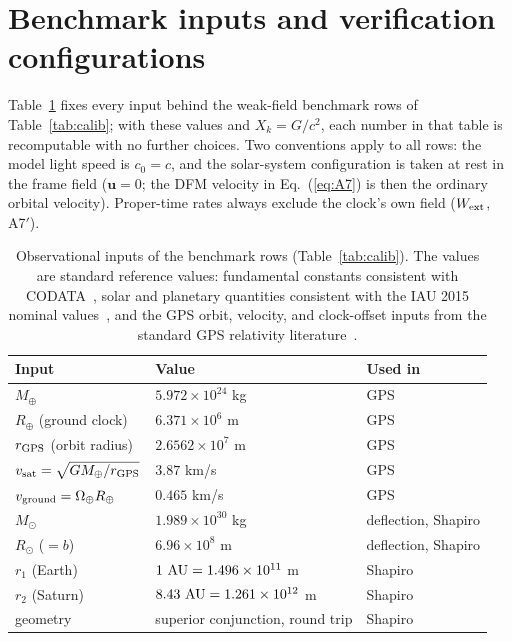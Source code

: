\documentclass[aps,reprint,amsmath,amssymb,nofootinbib,superscriptaddress,floatfix]{revtex4-2}
\newcommand{\vect}[1]{\bm{#1}}
\newcommand{\Kt}{X_k}
\begin{document}
\section{Benchmark inputs and verification configurations}
\label{app:inputs}

Table~\ref{tab:inputs} fixes every input behind the weak-field
benchmark rows of Table~\ref{tab:calib}; with these values and
$\Kt = G/c^2$, each number in that table is recomputable with no
further choices.
Two conventions apply to all rows: the model light speed is
$c_0 = c$, and the solar-system configuration is taken at rest in the
frame field ($\vect{u} = 0$; the DFM velocity in Eq.~(\ref{eq:A7}) is
then the ordinary orbital velocity).
Proper-time rates always exclude the clock's own field
($W_{\rm ext}$, A7$'$).

\begin{table}[h]
\caption{\label{tab:inputs}%
Observational inputs of the benchmark rows (Table~\ref{tab:calib}).
The values are standard reference values: fundamental constants
consistent with CODATA~\cite{CODATA2022}, solar and planetary
quantities consistent with the IAU 2015 nominal
values~\cite{Prsa2016}, and the GPS orbit, velocity, and clock-offset
inputs from the standard GPS relativity literature~\cite{Ashby2003}.}
\begin{ruledtabular}
\begin{tabular}{p{}p{}p{}}
Input & Value & Used in \\
\hline
$M_\oplus$ & $5.972\times10^{24}$ kg & GPS \\
$R_\oplus$ (ground clock) & $6.371\times10^{6}$ m & GPS \\
$r_{\rm GPS}$ (orbit radius) & $2.6562\times10^{7}$ m & GPS \\
$v_{\rm sat} = \sqrt{GM_\oplus/r_{\rm GPS}}$ & $3.87$ km/s & GPS \\
$v_{\rm ground} = \Omega_\oplus R_\oplus$ & $0.465$ km/s & GPS \\
$M_\odot$ & $1.989\times10^{30}$ kg & deflection, Shapiro \\
$R_\odot$ ($=b$) & $6.96\times10^{8}$ m & deflection, Shapiro \\
$r_1$ (Earth) & $1\ {\rm AU} = 1.496\times10^{11}$ m & Shapiro \\
$r_2$ (Saturn) & $8.43\ {\rm AU} = 1.261\times10^{12}$ m & Shapiro \\
geometry & superior conjunction, round trip & Shapiro \\
\end{tabular}
\end{ruledtabular}
\end{table}
\end{document}
